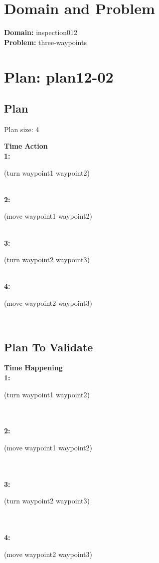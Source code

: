 \documentclass[a4paper,12pt]{article}
\author{\mbox{\sc {\sc Val}}}
\newcommand{\headingtimeaction}{{\bf Time} \qquad \= {\bf Action}\\[0.8ex]}
\newcommand{\headingtimehappening}{{\bf Time} \qquad \= {\bf Happening}\\[0.8ex]}
\newcommand{\atime}[1]{{\bf #1:}}
\newcommand{\action}[1]{{\sf #1}}
\newcommand{\listrow}[1]{\begin{minipage}[t]{11.5cm} #1 \end{minipage}}
\begin{document}
 \maketitle 
\section{Domain and Problem}
{\bf Domain:} inspection012\\
{\bf Problem:} three-waypoints
\section{\sloppy Plan: plan12-02}
\subsection{Plan}
Plan size: 4
\begin{tabbing}
\headingtimeaction 
\atime{1} \> \listrow{\action{(turn waypoint1 waypoint2)}}\\
\atime{2} \> \listrow{\action{(move waypoint1 waypoint2)}}\\
\atime{3} \> \listrow{\action{(turn waypoint2 waypoint3)}}\\
\atime{4} \> \listrow{\action{(move waypoint2 waypoint3)}}\\
\end{tabbing}
\subsection{Plan To Validate}
\begin{tabbing}
\headingtimehappening 
\atime{1}  \> \listrow{\action{(turn waypoint1 waypoint2)}}\\
\\\atime{2}  \> \listrow{\action{(move waypoint1 waypoint2)}}\\
\\\atime{3}  \> \listrow{\action{(turn waypoint2 waypoint3)}}\\
\\\atime{4}  \> \listrow{\action{(move waypoint2 waypoint3)}}\\
\end{tabbing}
\end{document}
